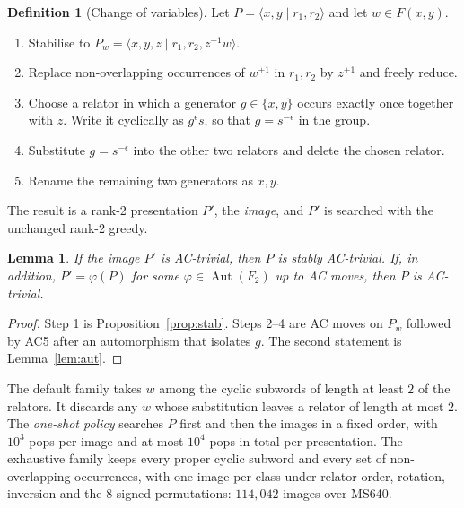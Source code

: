 \documentclass[11pt]{article}
\newtheorem{lemma}[theorem]{Lemma}
\theoremstyle{definition}
\newtheorem{definition}[theorem]{Definition}
\theoremstyle{remark}
\newcommand{\F}{F}
\newcommand{\pres}[2]{\langle #1 \mid #2 \rangle}
\newcommand{\Aut}{\operatorname{Aut}}
\begin{document}
\begin{definition}[Change of variables]
Let $P=\pres{x,y}{r_1,r_2}$ and let $w\in\F(x,y)$.
\begin{enumerate}
  \item Stabilise to $P_w=\pres{x,y,z}{r_1,r_2,z^{-1}w}$.
  \item Replace non-overlapping occurrences of $w^{\pm1}$ in $r_1,r_2$ by $z^{\pm1}$ and freely reduce.
  \item Choose a relator in which a generator $g\in\{x,y\}$ occurs exactly once together with $z$. Write it cyclically
  as $g^{\epsilon}s$, so that $g=s^{-\epsilon}$ in the group.
  \item Substitute $g=s^{-\epsilon}$ into the other two relators and delete the chosen relator.
  \item Rename the remaining two generators as $x,y$.
\end{enumerate}
The result is a rank-2 presentation $P'$, the \emph{image}, and $P'$ is searched with the unchanged rank-2 greedy.
\end{definition}

\begin{lemma}
If the image $P'$ is AC-trivial, then $P$ is stably AC-trivial. If, in addition, $P'=\varphi(P)$ for some
$\varphi\in\Aut(\F_2)$ up to AC moves, then $P$ is AC-trivial.
\end{lemma}

\begin{proof}
Step 1 is Proposition~\ref{prop:stab}. Steps 2--4 are AC moves on $P_w$ followed by AC5 after an automorphism that
isolates $g$. The second statement is Lemma~\ref{lem:aut}.
\end{proof}

The default family takes $w$ among the cyclic subwords of length at least $2$ of the relators. It discards any $w$
whose substitution leaves a relator of length at most $2$. The \emph{one-shot policy} searches $P$ first and then the
images in a fixed order, with $10^3$ pops per image and at most $10^4$ pops in total per presentation. The exhaustive
family keeps every proper cyclic subword and every set of non-overlapping occurrences, with one image per class under
relator order, rotation, inversion and the $8$ signed permutations: $114{,}042$ images over MS640.
\end{document}

